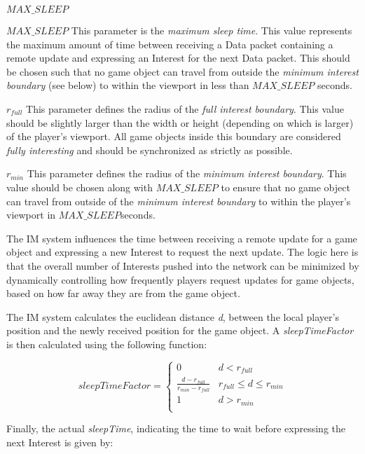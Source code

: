 \begin{labeling}{$MAX\_SLEEP$ }
    \item [$MAX\_SLEEP$] This parameter is the \textit{maximum sleep time}. This value represents the maximum amount of time between receiving a Data packet containing a remote update and expressing an Interest for the next Data packet. This should be chosen such that no game object can travel from outside the \textit{minimum interest boundary} (see below) to within the viewport in less than $MAX\_SLEEP$ seconds. 
    \item [$r_{full}$] This parameter defines the radius of the \textit{full interest boundary}. This value should be slightly larger than the width or height (depending on which is larger) of the player's viewport. All game objects inside this boundary are considered \textit{fully interesting} and should be synchronized as strictly as possible.
    \item [$r_{min}$] This parameter defines the radius of the \textit{minimum interest boundary}. This value should be chosen along with $MAX\_SLEEP$ to ensure that no game object can travel from outside of the \textit{minimum interest boundary} to within the player's viewport in $MAX\_SLEEP$seconds. 
\end{labeling}
    
The IM system influences the time between receiving a remote update for a game object and expressing a new Interest to request the next update. The logic here is that the overall number of Interests pushed into the network can be minimized by dynamically controlling how frequently players request updates for game objects, based on how far away they are from the game object.

The IM system calculates the euclidean distance \textit{d}, between the local player's position and the newly received position for the game object. A \textit{sleepTimeFactor} is then calculated using the following function:


\begin{equation}
sleepTimeFactor =
\begin{cases} 
    0 & d < r_{full} \\
    \frac{d - r_{full}}{r_{min} - r_{full}} & r_{full} \leq d \leq r_{min} \\
    1 & d > r_{min} \\
\end{cases}
\end{equation}

Finally, the actual \textit{sleepTime}, indicating the time to wait before expressing the next Interest is given by:

